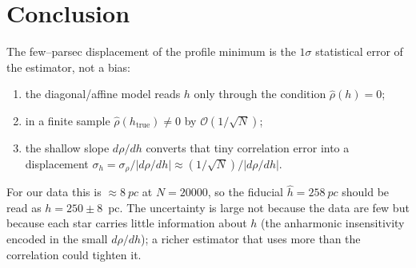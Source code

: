 \documentclass[11pt]{article}
\newcommand{\htrue}{h_{\mathrm{true}}}
\newcommand{\hhat}{\hat h}
\newcommand{\rhohat}{\hat\rho}
\begin{document}
\section{Conclusion}
The few--parsec displacement of the profile minimum is the $1\sigma$ statistical
error of the estimator, not a bias:
\begin{enumerate}\itemsep2pt
  \item the diagonal/affine model reads $h$ only through the condition
    $\rhohat(h)=0$;
  \item in a finite sample $\rhohat(\htrue)\neq0$ by $\mathcal O(1/\sqrt N)$;
  \item the shallow slope $d\rho/dh$ converts that tiny correlation error into a
    displacement $\sigma_h=\sigma_\rho/|d\rho/dh|\approx(1/\sqrt N)/|d\rho/dh|$.
\end{enumerate}
For our data this is $\approx\SI{8}{pc}$ at $N=\num{20000}$, so the fiducial
$\hhat=\SI{258}{pc}$ should be read as $h=250\pm8$~pc. The uncertainty is large
not because the data are few but because each star carries little information
about $h$ (the anharmonic insensitivity encoded in the small $d\rho/dh$); a
richer estimator that uses more than the correlation could tighten it.
\end{document}
